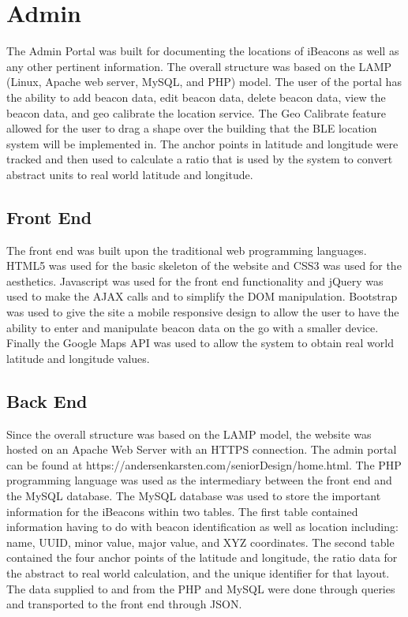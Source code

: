 \section{Admin}
The Admin Portal was built for documenting the locations of iBeacons as well as any other pertinent information. The overall
structure was based on the LAMP (Linux, Apache web server, MySQL, and PHP) model. The user of the portal has the ability to add beacon data, edit beacon data,
delete beacon data, view the beacon data, and geo calibrate the location service. The Geo Calibrate feature allowed for the
user to drag a shape over the building that the BLE location system will be implemented in. The anchor points in latitude
and longitude were tracked and then used to calculate a ratio that is used by the system to convert abstract units to
real world latitude and longitude.

\subsection{Front End}
The front end was built upon the traditional web programming languages. HTML5 was used for the basic skeleton of the website
and CSS3 was used for the aesthetics. Javascript was used for the front end functionality and jQuery was used to make the AJAX calls
and to simplify the DOM manipulation. Bootstrap was used to give the site a mobile responsive design to allow the user to have the ability
to enter and manipulate beacon data on the go with a smaller device. Finally the Google Maps API was used to allow the system to obtain
real world latitude and longitude values.

\subsection{Back End}
Since the overall structure was based on the LAMP model, the website was hosted on an Apache Web Server with an HTTPS connection. The admin portal can be
found at https://andersenkarsten.com/seniorDesign/home.html. The PHP programming language was used as the intermediary between the front end and the MySQL database.
The MySQL database was used to store the important information for the iBeacons within two tables. The first table contained information having to do with beacon identification as well as location including:
name, UUID, minor value, major value, and XYZ coordinates. The second table contained the four anchor points of the latitude and longitude, the ratio data for the abstract to real world calculation, and the unique identifier for that layout.
The data supplied to and from the PHP and MySQL were done through queries and transported to the front end through JSON.
